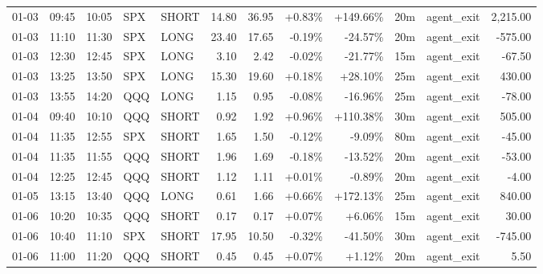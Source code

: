 \documentclass[11pt,a4paper]{article}
\begin{document}
\begin{center}
\begin{longtable}{>{\color{txtmain}}l l l l l r r r r r >{\color{txtmain}}l r}
01-03 & 09:45 & 10:05 & SPX & SHORT & 14.80 & 36.95 & \textcolor{wingreen}{+0.83\%} & \textcolor{wingreen}{+149.66\%} & 20m & agent\_exit & \textcolor{wingreen}{2,215.00} \\
01-03 & 11:10 & 11:30 & SPX & LONG & 23.40 & 17.65 & \textcolor{lossred}{-0.19\%} & \textcolor{lossred}{-24.57\%} & 20m & agent\_exit & \textcolor{lossred}{-575.00} \\
01-03 & 12:30 & 12:45 & SPX & LONG & 3.10 & 2.42 & \textcolor{lossred}{-0.02\%} & \textcolor{lossred}{-21.77\%} & 15m & agent\_exit & \textcolor{lossred}{-67.50} \\
01-03 & 13:25 & 13:50 & SPX & LONG & 15.30 & 19.60 & \textcolor{wingreen}{+0.18\%} & \textcolor{wingreen}{+28.10\%} & 25m & agent\_exit & \textcolor{wingreen}{430.00} \\
01-03 & 13:55 & 14:20 & QQQ & LONG & 1.15 & 0.95 & \textcolor{lossred}{-0.08\%} & \textcolor{lossred}{-16.96\%} & 25m & agent\_exit & \textcolor{lossred}{-78.00} \\
01-04 & 09:40 & 10:10 & QQQ & SHORT & 0.92 & 1.92 & \textcolor{wingreen}{+0.96\%} & \textcolor{wingreen}{+110.38\%} & 30m & agent\_exit & \textcolor{wingreen}{505.00} \\
01-04 & 11:35 & 12:55 & SPX & SHORT & 1.65 & 1.50 & \textcolor{lossred}{-0.12\%} & \textcolor{lossred}{-9.09\%} & 80m & agent\_exit & \textcolor{lossred}{-45.00} \\
01-04 & 11:35 & 11:55 & QQQ & SHORT & 1.96 & 1.69 & \textcolor{lossred}{-0.18\%} & \textcolor{lossred}{-13.52\%} & 20m & agent\_exit & \textcolor{lossred}{-53.00} \\
01-04 & 12:25 & 12:45 & QQQ & SHORT & 1.12 & 1.11 & \textcolor{wingreen}{+0.01\%} & \textcolor{lossred}{-0.89\%} & 20m & agent\_exit & \textcolor{lossred}{-4.00} \\
01-05 & 13:15 & 13:40 & QQQ & LONG & 0.61 & 1.66 & \textcolor{wingreen}{+0.66\%} & \textcolor{wingreen}{+172.13\%} & 25m & agent\_exit & \textcolor{wingreen}{840.00} \\
01-06 & 10:20 & 10:35 & QQQ & SHORT & 0.17 & 0.17 & \textcolor{wingreen}{+0.07\%} & \textcolor{wingreen}{+6.06\%} & 15m & agent\_exit & \textcolor{wingreen}{30.00} \\
01-06 & 10:40 & 11:10 & SPX & SHORT & 17.95 & 10.50 & \textcolor{lossred}{-0.32\%} & \textcolor{lossred}{-41.50\%} & 30m & agent\_exit & \textcolor{lossred}{-745.00} \\
01-06 & 11:00 & 11:20 & QQQ & SHORT & 0.45 & 0.45 & \textcolor{wingreen}{+0.07\%} & \textcolor{wingreen}{+1.12\%} & 20m & agent\_exit & \textcolor{wingreen}{5.50} \\

\end{longtable}
\end{center}
\end{document}
